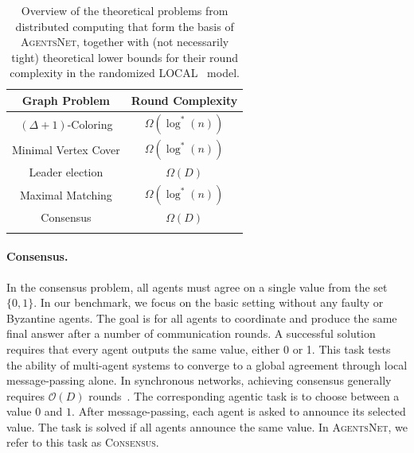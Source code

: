 \documentclass{article}
\newcommand{\benchmark}{\textsc{AgentsNet}}
\begin{document}
\begin{table}
    \centering
    \begin{tabular}{cc} \toprule
       Graph Problem  & Round Complexity \\ \midrule
        $(\Delta + 1)$-Coloring & $\Omega(\log^*(n))$\\%
        Minimal Vertex Cover & $\Omega(\log^*(n))$\\%
        Leader election & $\Omega(D)$\\%
        Maximal Matching & $\Omega(\log^*(n))$\\%
        Consensus & $\Omega(D)$\\%
        \bottomrule \\
    \end{tabular}
    \caption{Overview of the theoretical problems from distributed computing that form the basis of \benchmark{}, together with (not necessarily tight) theoretical lower bounds for their round complexity in the randomized LOCAL~\citep{linial1992local} model.}
    \label{tab:theory_problem_overview}
\end{table}

\paragraph{Consensus.}
In the consensus problem, all agents must agree on a single value from the set $\{0, 1\}$. In our benchmark, we focus on the basic setting without any faulty or Byzantine agents. The goal is for all agents to coordinate and produce the same final answer after a number of communication rounds. A successful solution requires that every agent outputs the same value, either 0 or 1. This task tests the ability of multi-agent systems to converge to a global agreement through local message-passing alone. In synchronous networks, achieving consensus generally requires $\mathcal{O}(D)$ rounds~\cite{lynch1996distributed}. The corresponding agentic task is to choose between a value $0$ and $1$. After message-passing, each agent is asked to announce its selected value. The task is solved if all agents announce the same value. In \benchmark{}, we refer to this task as \textsc{Consensus}.
\end{document}
